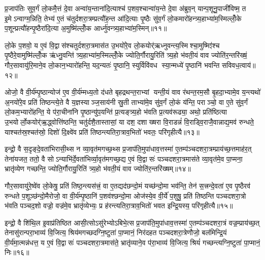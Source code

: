 प्र॒जाप॑तिः सुव॒र्गं लो॒कमै॒त्तं दे॒वा अन्वा॑य॒न्ताना॑दि॒त्याश्च॑ प॒शव॒श्चान्वा॑य॒न्ते दे॒वा अ॑ब्रुव॒न् यान्प॒शूनु॒पाजी॑विष्म॒ त इ॒मेऽन्वाग्म॒न्निति॒ तेभ्य॑ ए॒तं च॑तुर्दशरा॒त्रम्प्रत्यौ॑ह॒न्त आ॑दि॒त्याः पृ॒ष्ठैः सु॑व॒र्गं लो॒कमारो॑हन्त्र्य॒हाभ्या॑म॒स्मिल्लोँ॒के प॒शून्प्रत्यौ॑हन्पृ॒ष्ठैरा॑दि॒त्या अ॒मुष्मि॑ल्लोँ॒क आर्ध्नु॑वन्त्र्य॒हाभ्या॑म॒स्मिन्॥११॥

लो॒के प॒शवो॒ य ए॒वं वि॒द्वास॑श्चतुर्दशरा॒त्रमास॑त उ॒भयो॑रे॒व लो॒कयोर्॑ऋध्नुवन्त्य॒स्मिश्चा॒मुष्मिꣵ॑श्च पृ॒ष्ठैरे॒वामुष्मि॑ल्लोँ॒क ऋ॑ध्नु॒वन्ति॑ त्र्य॒हाभ्या॑म॒स्मिल्लोँ॒के ज्योति॒र्गौरायु॒रिति॑ त्र्य॒हो भ॑वती॒यं वाव ज्योति॑र॒न्तरि॑ख्षं॒ गौर॒सावायु॑रि॒माने॒व लो॒कान॒भ्यारो॑हन्ति॒ यद॒न्यतः॑ पृ॒ष्ठानि॒ स्युर्विवि॑वध स्या॒न्मध्ये॑ पृ॒ष्ठानि॑ भवन्ति सविवध॒त्वाय॑॥१२॥

ओजो॒ वै वी॒र्य॑म्पृ॒ष्ठान्योज॑ ए॒व वी॒र्य॑म्मध्य॒तो द॑धते बृहद्रथन्त॒राभ्यां यन्ती॒यं वाव र॑थन्त॒रम॒सौ बृ॒हदा॒भ्यामे॒व य॒न्त्यथो॑ अ॒नयो॑रे॒व प्रति॑ तिष्ठन्त्ये॒ते वै य॒ज्ञस्याञ्ज॒साय॑नी स्रु॒ती ताभ्या॑मे॒व सु॑व॒र्गं लो॒कं य॑न्ति॒ पराञ्चो॒ वा ए॒ते सु॑व॒र्गं लो॒कम॒भ्यारो॑हन्ति॒ ये प॑रा॒चीना॑नि पृ॒ष्ठान्यु॑प॒यन्ति॑ प्र॒त्यङ्त्र्य॒हो भ॑वति प्र॒त्यव॑रूढ्या॒ अथो॒ प्रति॑ष्ठित्या उ॒भयोर्लो॒कयोर्\mbox{}॑ऋ॒द्ध्वोत्ति॑ष्ठन्ति॒ चतु॑र्दशै॒तास्तासां॒ या दश॒ दशाख्षरा वि॒राडन्नं॑ वि॒राड्वि॒राजै॒वान्नाद्य॒मव॑ रुन्धते॒ याश्चत॑स्र॒श्चत॑स्रो॒ दिशो॑ दि॒क्ष्वे॑व प्रति॑ तिष्ठन्त्यतिरा॒त्राव॒भितो॑ भवतः॒ परि॑गृहीत्यै॥१३॥

{\anuvakamend[{आर्ध्नु॑वन्त्र्य॒हाभ्या॑म॒स्मिन्थ्स॑विवध॒त्वाय॒ प्रति॑ष्ठित्या॒ एक॑त्रिशच्च॥५॥}]}

इन्द्रो॒ वै स॒दृङ्दे॒वता॑भिरासी॒थ्स न व्या॒वृत॑मगच्छ॒थ्स प्र॒जाप॑ति॒मुपा॑धाव॒त्तस्मा॑ ए॒तम्प॑ञ्चदशरा॒त्रम्प्राय॑च्छ॒त्तमाह॑र॒त् तेना॑यजत॒ ततो॒ वै सोऽन्याभि॑र्दे॒वता॑भिर्व्या॒वृत॑मगच्छ॒द्य ए॒वं वि॒द्वासः॑ पञ्चदशरा॒त्रमास॑ते व्या॒वृत॑मे॒व पा॒प्मना॒ भ्रातृ॑व्येण गच्छन्ति॒ ज्योति॒र्गौरायु॒रिति॑ त्र्य॒हो भ॑वती॒यं वाव ज्योति॑र॒न्तरि॑ख्षम्॥१४॥

गौर॒सावायु॑रे॒ष्वे॑व लो॒केषु॒ प्रति॑ तिष्ठ॒न्त्यस॑त्त्रं॒ वा ए॒तद्यद॑छन्दो॒मं यच्छ॑न्दो॒मा भव॑न्ति॒ तेन॑ स॒त्त्रन्दे॒वता॑ ए॒व पृ॒ष्ठैरव॑ रुन्धते प॒शूञ्छ॑न्दो॒मैरोजो॒ वा वी॒र्य॑म्पृ॒ष्ठानि॑ प॒शव॑श्छन्दो॒मा ओज॑स्ये॒व वी॒र्ये॑ प॒शुषु॒ प्रति॑ तिष्ठन्ति पञ्चदशरा॒त्रो भ॑वति पञ्चद॒शो वज्रो॒ वज्र॑मे॒व भ्रातृ॑व्येभ्यः॒ प्र ह॑रन्त्यतिरा॒त्राव॒भितो॑ भवत इन्द्रि॒यस्य॒ परि॑गृहीत्यै॥१५॥

{\anuvakamend[{अ॒न्तरि॑ख्षमिन्द्रि॒यस्यैक॑ञ्च॥६॥}]}

इन्द्रो॒ वै शि॑थि॒ल इ॒वाप्र॑तिष्ठित आसी॒त्सोऽसु॑रेभ्योऽबिभे॒त्स प्र॒जाप॑ति॒मुपा॑धाव॒त्तस्मा॑ ए॒तम्प॑ञ्चदशरा॒त्रं वज्र॒म्प्राय॑च्छ॒त् तेनासु॑रान्परा॒भाव्य॑ वि॒जित्य॒ श्रिय॑मगच्छदग्नि॒ष्टुता॑ पा॒प्मानं॒ निर॑दहत पञ्चदशरा॒त्रेणौजो॒ बल॑मिन्द्रि॒यं वी॒र्य॑मा॒त्मन्न॑धत्त॒ य ए॒वं वि॒द्वासः॑ पञ्चदशरा॒त्रमास॑ते॒ भ्रातृ॑व्याने॒व प॑रा॒भाव्य॑ वि॒जित्य॒ श्रियं॑ गच्छन्त्यग्नि॒ष्टुता॑ पा॒प्मानं॒ निः॥१६॥


